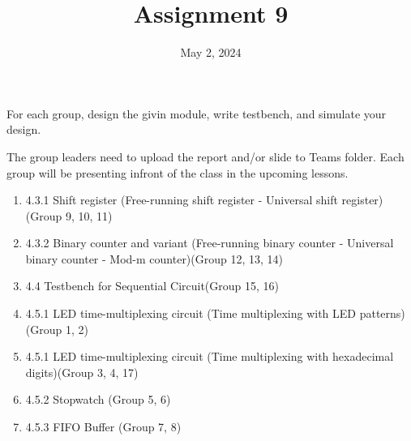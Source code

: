 \documentclass{vhdl-assignment}
\title{Assignment 9}
\date{May 2, 2024}
\begin{document}
\maketitle
\thispagestyle{fancy}

For each group, design the givin module, write testbench, and simulate your design.

The group leaders need to upload the report and/or slide to Teams folder. Each group will be presenting infront of the class in the upcoming lessons.

\begin{enumerate}
    \item 4.3.1 Shift register (Free-running shift register - Universal shift register) (Group 9, 10, 11)
    \item 4.3.2 Binary counter and variant (Free-running binary counter - Universal binary counter - Mod-m counter)(Group 12, 13, 14)
    \item 4.4 Testbench for Sequential Circuit(Group 15, 16)
    \item 4.5.1 LED time-multiplexing circuit (Time multiplexing with LED patterns)(Group 1, 2)
    \item 4.5.1 LED time-multiplexing circuit (Time multiplexing with hexadecimal digits)(Group 3, 4, 17)
    \item 4.5.2 Stopwatch (Group 5, 6)
    \item 4.5.3 FIFO Buffer (Group 7, 8)
\end{enumerate}

\end{document}
